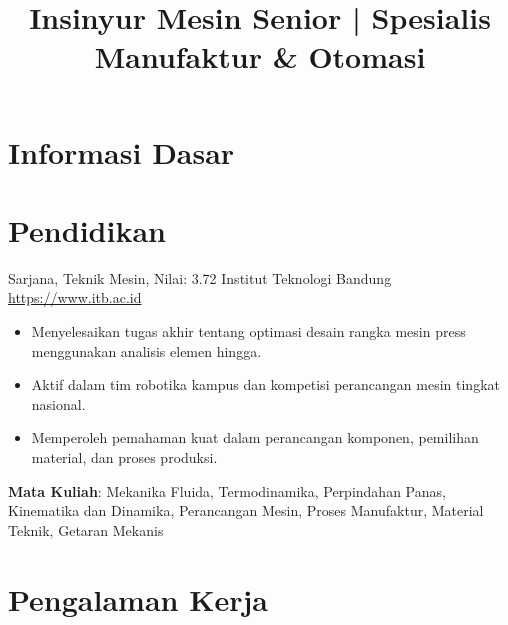\documentclass[a4paper, serif, 10pt]{moderncv}
\title{Insinyur Mesin Senior | Spesialis Manufaktur \& Otomasi}
\begin{document}
\maketitle

\section{Informasi Dasar}

\section{Pendidikan}

        {Sarjana, Teknik Mesin, Nilai: 3.72}
        {Institut Teknologi Bandung}
        {\url{https://www.itb.ac.id}}
        {}
        {\begin{itemize}
\item Menyelesaikan tugas akhir tentang optimasi desain rangka mesin press menggunakan analisis elemen hingga.
\item Aktif dalam tim robotika kampus dan kompetisi perancangan mesin tingkat nasional.
\item Memperoleh pemahaman kuat dalam perancangan komponen, pemilihan material, dan proses produksi.
\end{itemize}
\textbf{Mata Kuliah}: Mekanika Fluida, Termodinamika, Perpindahan Panas, Kinematika dan Dinamika, Perancangan Mesin, Proses Manufaktur, Material Teknik, Getaran Mekanis}
\section{Pengalaman Kerja}
\end{document}
